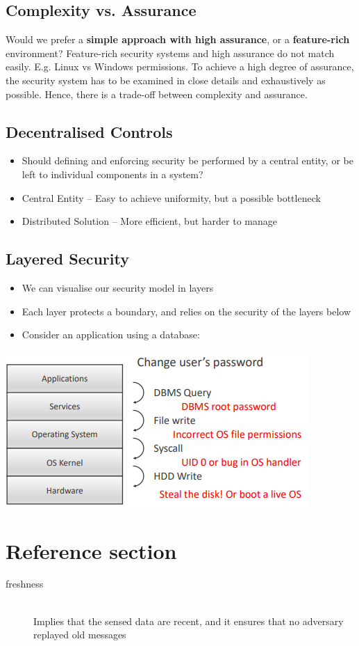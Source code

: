 \documentclass{article}
\begin{document}
\subsection{Complexity vs. Assurance}
\begin{flushleft}
Would we prefer a \textbf{simple approach with high assurance}, or a \textbf{feature-rich} environment? Feature-rich security systems and high assurance do not match easily. E.g. Linux vs Windows permissions. To achieve a high degree of assurance, the security system has to be examined in close details and exhaustively as possible. Hence, there is a trade-off between complexity and assurance.
\end{flushleft}

\subsection{Decentralised Controls}
\begin{itemize}
  \item Should defining and enforcing security be performed by a central entity, or be left to individual components in a system?
  \item Central Entity – Easy to achieve uniformity, but a possible bottleneck 
  \item Distributed Solution – More efficient, but harder to manage
\end{itemize}

\subsection{Layered Security}
\begin{itemize}
  \item We can visualise our security model in layers 
  \item Each layer protects a boundary, and relies on the security of the layers below
  \item Consider an application using a database:
\end{itemize}
\begin{center}
  \includegraphics[scale=0.5]{layer_security.png}
\end{center}

\pagebreak
\section*{Reference section} \label{sec:reference}
\begin{description}
	\item[freshness] \hfill \\ Implies that the sensed data are recent, and it ensures that no adversary replayed old messages
\end{description}
\end{document}
